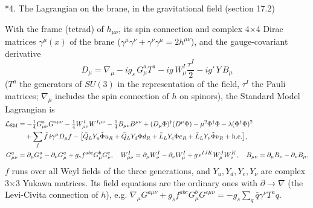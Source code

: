 \documentclass[10pt,a4paper]{article}
\makeatletter
\renewcommand\section{\@startsection{section}{1}{\z@}{-3.5ex \@plus -1ex \@minus -.2ex}{2.3ex \@plus.2ex}{\normalfont\Large\bfseries\raggedright}}
\makeatother
\begin{document}
\section*{4. The Lagrangian on the brane, in the gravitational field (section 17.2)}
With the frame (tetrad) of $h_{\mu\nu}$, its spin connection and complex 4×4 Dirac matrices $\gamma^\mu(x)$ of the brane ($\gamma^\mu\gamma^\nu+\gamma^\nu\gamma^\mu=2h^{\mu\nu}$), and the gauge-covariant derivative
\begin{equation*}
D_\mu=\nabla_\mu-ig_s\,G^a_\mu T^a-ig\,W^I_\mu\frac{\tau^I}2-ig'\,Y\,B_\mu
\end{equation*}
($T^a$ the generators of $SU(3)$ in the representation of the field, $\tau^I$ the Pauli matrices; $\nabla_\mu$ includes the spin connection of $h$ on spinors), the Standard Model Lagrangian is
\begin{align*}
\mathcal L_{\rm SM}&=-\tfrac14G^a_{\mu\nu}G^{a\mu\nu}-\tfrac14W^I_{\mu\nu}W^{I\mu\nu}-\tfrac14B_{\mu\nu}B^{\mu\nu}+(D_\mu\Phi)^\dagger(D^\mu\Phi)-\mu^2\Phi^\dagger\Phi-\lambda(\Phi^\dagger\Phi)^2 \\
&\quad+\sum_f\bar f\,i\gamma^\mu D_\mu f-\big[\bar Q_LY_u\tilde\Phi u_R+\bar Q_LY_d\Phi d_R+\bar L_LY_e\Phi e_R+\bar L_LY_\nu\tilde\Phi\nu_R+\mathrm{h.c.}\big], \\
G^a_{\mu\nu}&=\partial_\mu G^a_\nu-\partial_\nu G^a_\mu+g_sf^{abc}G^b_\mu G^c_\nu,\quad W^I_{\mu\nu}=\partial_\mu W^I_\nu-\partial_\nu W^I_\mu+g\,\epsilon^{IJK}W^J_\mu W^K_\nu,\quad B_{\mu\nu}=\partial_\mu B_\nu-\partial_\nu B_\mu,
\end{align*}
$f$ runs over all Weyl fields of the three generations, and $Y_u,Y_d,Y_e,Y_\nu$ are complex 3×3 Yukawa matrices. Its field equations are the ordinary ones with $\partial\to\nabla$ (the Levi-Civita connection of $h$), e.g. $\nabla_\mu G^{a\mu\nu}+g_sf^{abc}G^b_\mu G^{c\mu\nu}=-g_s\sum_q\bar q\gamma^\nu T^aq$.
\end{document}

